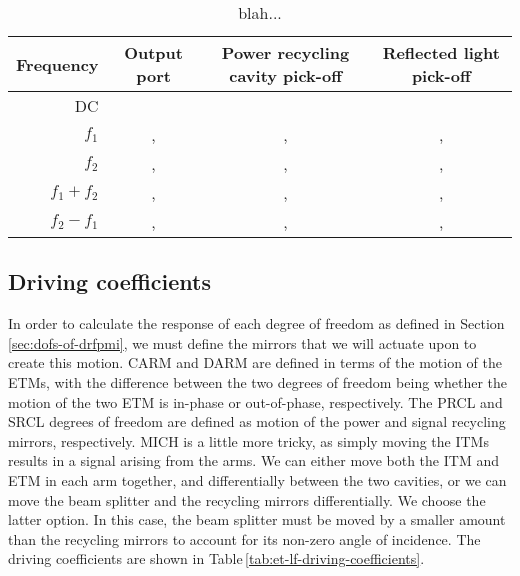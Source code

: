 \begin{table}
  \centering
  {\renewcommand{\arraystretch}{1.2} %
    \begin{tabular}{r|ccc}
      \textbf{Frequency} & \textbf{Output port} & \textbf{Power recycling cavity pick-off} & \textbf{Reflected light pick-off} \\
      \hline
      \gls{DC} & \ASDC{} & \POPDC{} & \REFLDC{} \\
      $f_1$    & \ASFIRSTI{}, \ASFIRSTQ{} & \POPFIRSTI{}, \POPFIRSTQ{} & \REFLFIRSTI{}, \REFLFIRSTQ{} \\
      $f_2$    & \ASSECONDI{}, \ASSECONDQ{} & \POPSECONDI{}, \POPSECONDQ{} & \REFLSECONDI{}, \REFLSECONDQ{} \\
      $f_1 + f_2$ & \ASSUMI{}, \ASSUMQ{} & \POPSUMI{}, \POPSUMQ{} & \REFLSUMI{}, \REFLSUMQ{} \\
      $f_2 - f_1$ & \ASDIFFI{}, \ASDIFFQ{} & \POPDIFFI{}, \POPDIFFQ{} & \REFLDIFFI{}, \REFLDIFFQ{}
    \end{tabular}
  }
  \caption{\label{tab:et-lf-probes}blah...}
\end{table}

\subsection{Driving coefficients}
In order to calculate the response of each degree of freedom as defined in Section\,\ref{sec:dofs-of-drfpmi}, we must define the mirrors that we will actuate upon to create this motion. \gls{CARM} and \gls{DARM} are defined in terms of the motion of the \glspl{ETM}, with the difference between the two degrees of freedom being whether the motion of the two \gls{ETM} is in-phase or out-of-phase, respectively. The \gls{PRCL} and \gls{SRCL} degrees of freedom are defined as motion of the power and signal recycling mirrors, respectively. \gls{MICH} is a little more tricky, as simply moving the \glspl{ITM} results in a signal arising from the arms. We can either move both the \gls{ITM} and \gls{ETM} in each arm together, and differentially between the two cavities, or we can move the beam splitter and the recycling mirrors differentially. We choose the latter option. In this case, the beam splitter must be moved by a smaller amount than the recycling mirrors to account for its non-zero angle of incidence. The driving coefficients are shown in Table\,\ref{tab:et-lf-driving-coefficients}.

